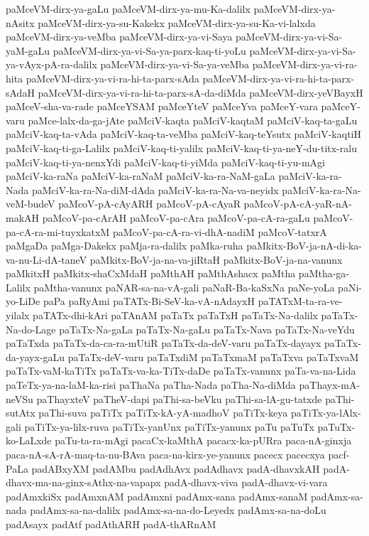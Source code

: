 {paMceVM-dirx-ya-gaLu
paMceVM-dirx-ya-mu-Ka-dalilx
paMceVM-dirx-ya-nAsitx
paMceVM-dirx-ya-su-Kakekx
paMceVM-dirx-ya-su-Ka-vi-lalxda
paMceVM-dirx-ya-veMba
paMceVM-dirx-ya-vi-Saya
paMceVM-dirx-ya-vi-Sa-yaM-gaLu
paMceVM-dirx-ya-vi-Sa-ya-parx-kaq-ti-yoLu
paMceVM-dirx-ya-vi-Sa-ya-vAyx-pA-ra-dalilx
paMceVM-dirx-ya-vi-Sa-ya-veMba
paMceVM-dirx-ya-vi-ra-hita
paMceVM-dirx-ya-vi-ra-hi-ta-parx-sAda
paMceVM-dirx-ya-vi-ra-hi-ta-parx-sAdaH
paMceVM-dirx-ya-vi-ra-hi-ta-parx-sA-da-diMda
paMceVM-dirx-yeVBayxH
paMceV-sha-va-rade
paMceYSAM
paMceYteV
paMceYva
paMceY-vara
paMceY-varu
paMce-lalx-da-ga-jAte
paMciV-kaqta
paMciV-kaqtaM
paMciV-kaq-ta-gaLu
paMciV-kaq-ta-vAda
paMciV-kaq-ta-veMba
paMciV-kaq-teYsutx
paMciV-kaqtiH
paMciV-kaq-ti-ga-Lalilx
paMciV-kaq-ti-yalilx
paMciV-kaq-ti-ya-neY-du-titx-ralu
paMciV-kaq-ti-ya-nenxYdi
paMciV-kaq-ti-yiMda
paMciV-kaq-ti-yu-mAgi
paMciV-ka-raNa
paMciV-ka-raNaM
paMciV-ka-ra-NaM-gaLa
paMciV-ka-ra-Nada
paMciV-ka-ra-Na-diM-dAda
paMciV-ka-ra-Na-va-neyidx
paMciV-ka-ra-Na-veM-budeV
paMcoV-pA-cAyARH
paMcoV-pA-cAyaR
paMcoV-pA-cA-yaR-nA-makAH
paMcoV-pa-cArAH
paMcoV-pa-cAra
paMcoV-pa-cA-ra-gaLu
paMcoV-pa-cA-ra-mi-tuyxkatxM
paMcoV-pa-cA-ra-vi-dhA-nadiM
paMcoV-tatxrA
paMgaDa
paMga-Dakekx
paMja-ra-dalilx
paMka-ruha
paMkitx-BoV-ja-nA-di-ka-va-nu-Li-dA-taneV
paMkitx-BoV-ja-na-va-jiRtaH
paMkitx-BoV-ja-na-vanunx
paMkitxH
paMkitx-shaCxMdaH
paMthAH
paMthAshacx
paMtha
paMtha-ga-Lalilx
paMtha-vanunx
paNAR-sa-na-vA-gali
paNaR-Ba-kaSxNa
paNe-yoLa
paNi-yo-LiDe
paPa
paRyAmi
paTATx-Bi-SeV-ka-vA-nAdayxH
paTATxM-ta-ra-ve-yilalx
paTATx-dhi-kAri
paTAnAM
paTaTx
paTaTxH
paTaTx-Na-dalilx
paTaTx-Na-do-Lage
paTaTx-Na-gaLa
paTaTx-Na-gaLu
paTaTx-Nava
paTaTx-Na-veYdu
paTaTxda
paTaTx-da-ca-ra-mUtiR
paTaTx-da-deV-varu
paTaTx-dayayx
paTaTx-da-yayx-gaLu
paTaTx-deV-varu
paTaTxdiM
paTaTxmaM
paTaTxva
paTaTxvaM
paTaTx-vaM-kaTiTx
paTaTx-va-ka-TiTx-daDe
paTaTx-vanunx
paTa-va-na-Lida
paTeTx-ya-na-laM-ka-risi
paThaNa
paTha-Nada
paTha-Na-diMda
paThayx-mA-neVSu
paThayxteV
paTheV-dapi
paThi-sa-beVku
paThi-sa-lA-gu-tatxde
paThi-sutAtx
paThi-suva
paTiTx
paTiTx-kA-yA-madhoV
paTiTx-keya
paTiTx-ya-lAlx-gali
paTiTx-ya-lilx-ruva
paTiTx-yanUnx
paTiTx-yanunx
paTu
paTuTx
paTuTx-ko-LaLxde
paTu-ta-ra-mAgi
pacaCx-kaMthA
pacacx-ka-pURra
paca-nA-ginxja
paca-nA-sA-rA-maq-ta-nu-BAva
paca-na-kirx-ye-yanunx
pacecx
pacecxya
pacf-PaLa
padABxyXM
padAMbu
padAdhAvx
padAdhavx
padA-dhavxkAH
padA-dhavx-ma-na-ginx-sAthx-na-vapapx
padA-dhavx-viva
padA-dhavx-vi-vara
padAmxkiSx
padAmxnAM
padAmxni
padAmx-sana
padAmx-sanaM
padAmx-sa-nada
padAmx-sa-na-dalilx
padAmx-sa-na-do-Leyedx
padAmx-sa-na-doLu
padAsayx
padAtf
padAthARH
padA-thARnAM
}
